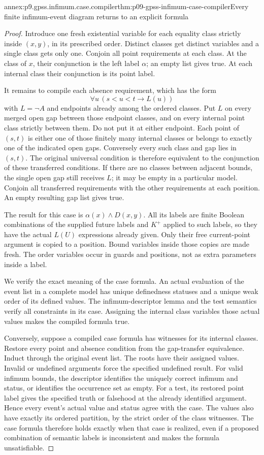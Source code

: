 \begin{annexitem}{annex:p9.gpss.infimum.case.compiler}{thm:p09-gpss-infimum-case-compiler}{Every finite infimum-event diagram returns to an explicit formula}
\begin{proof}
Introduce one fresh existential variable for each equality
class strictly inside \((x,y)\), in its prescribed order.
Distinct classes get distinct variables and a single class
gets only one. Conjoin all point requirements at each class.
At the class of \(x\), their conjunction is the left
label \(\alpha\); an empty list gives true. At each
internal class their conjunction is its point label.

It remains to compile each absence requirement, which has
the form
\[
                    \forall u\,(s<u<t\to L(u))
\]
with \(L=\neg A\) and endpoints already among the
ordered classes. Put \(L\) on every merged open gap
between those endpoint classes, and on every internal
point class strictly between them. Do not put it at
either endpoint. Each point of \((s,t)\) is either
one of those finitely many internal classes or belongs
to exactly one of the indicated open gaps. Conversely
every such class and gap lies in \((s,t)\). The
original universal condition is therefore equivalent
to the conjunction of these transferred conditions.
If there are no classes between adjacent bounds,
the single open gap still receives \(L\); it may
be empty in a particular model. Conjoin all transferred
requirements with the other requirements at each
position. An empty resulting gap list gives true.

The result for this case is \(\alpha(x)\land D(x,y)\).
All its labels are finite Boolean combinations of the
supplied future labels and \(K^+\) applied to such labels,
so they have the actual \(L(U)\) expressions already given.
Only their free current-point argument is copied to a
position. Bound variables inside those copies are made
fresh. The order variables occur in guards and positions,
not as extra parameters inside a label.

We verify the exact meaning of the case formula. An actual
evaluation of the event list in a complete model has
unique definedness statuses and a unique weak order of
its defined values. The infimum-descriptor lemma and
the test semantics verify all constraints in its case.
Assigning the internal class variables those actual
values makes the compiled formula true.

Conversely, suppose a compiled case formula has witnesses
for its internal classes. Restore every point and
absence condition from the gap-transfer equivalence.
Induct through the original event list. The roots
have their assigned values. Invalid or undefined
arguments force the specified undefined result.
For valid infimum bounds, the descriptor identifies
the uniquely correct infimum and status, or identifies
the occurrence set as empty. For a test, its restored
point label gives the specified truth or falsehood
at the already identified argument. Hence every
event's actual value and status agree with the case.
The values also have exactly its ordered partition,
by the strict order of the class witnesses. The case
formula therefore holds exactly when that case is
realized, even if a proposed combination of semantic
labels is inconsistent and makes the formula unsatisfiable.


\end{proof}
\end{annexitem}
